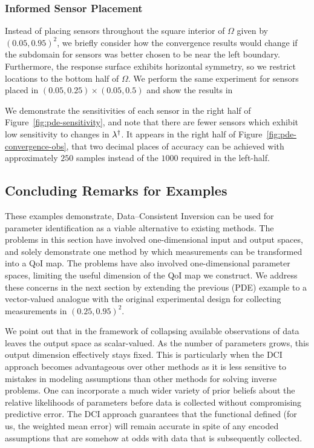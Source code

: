 \subsubsection{Informed Sensor Placement}
Instead of placing sensors throughout the square interior of $\Omega$ given by $(0.05, 0.95)^2$, we briefly consider how the convergence results would change if the subdomain for sensors was better chosen to be near the left boundary.
Furthermore, the response surface exhibits horizontal symmetry, so we restrict locations to the bottom half of $\Omega$.
We perform the same experiment for sensors placed in $(0.05, 0.25)\times(0.05, 0.5)$ and show the results in

We demonstrate the sensitivities of each sensor in the right half of Figure~\ref{fig:pde-sensitivity}, and note that there are fewer sensors which exhibit low sensitivity to changes in $\lambda^\dagger$.
It appears in the right half of Figure~\ref{fig:pde-convergence-obs}, that two decimal places of accuracy can be achieved with approximately $250$ samples instead of the $1000$ required in the left-half.


\subsection{Concluding Remarks for Examples}

These examples demonstrate, Data--Consistent Inversion can be used for parameter identification as a viable alternative to existing methods.
The problems in this section have involved one-dimensional input and output spaces, and solely demonstrate one method by which measurements can be transformed into a QoI map.
The problems have also involved one-dimensional parameter spaces, limiting the useful dimension of the QoI map we construct.
We address these concerns in the next section by extending the previous (PDE) example to a vector-valued analogue with the original experimental design for collecting measurements in $(0.25, 0.95)^2$.

We point out that in the framework of collapsing available observations of data leaves the output space as scalar-valued.
As the number of parameters grows, this output dimension effectively stays fixed.
This is particularly when the DCI approach becomes advantageous over other methods as it is less sensitive to mistakes in modeling assumptions than other methods for solving inverse problems.
One can incorporate a much wider variety of prior beliefs about the relative likelihoods of parameters before data is collected without compromising predictive error.
The DCI approach guarantees that the functional defined (for us, the weighted mean error) will remain accurate in spite of any encoded assumptions that are somehow at odds with data that is subsequently collected.
